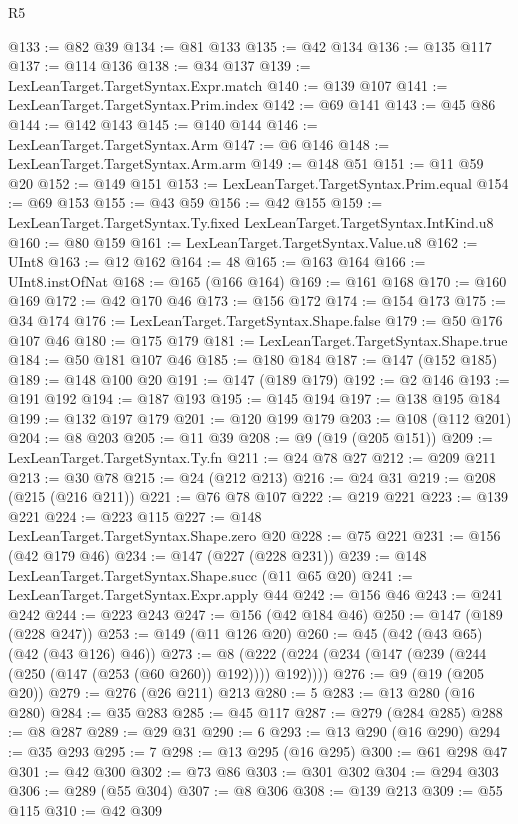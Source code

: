 \begin{lexlean}{R5}
\begin{coremodule}
@133 := @82 @39
@134 := @81 @133
@135 := @42 @134
@136 := @135 @117
@137 := @114 @136
@138 := @34 @137
@139 := LexLeanTarget.TargetSyntax.Expr.match
@140 := @139 @107
@141 := LexLeanTarget.TargetSyntax.Prim.index
@142 := @69 @141
@143 := @45 @86
@144 := @142 @143
@145 := @140 @144
@146 := LexLeanTarget.TargetSyntax.Arm
@147 := @6 @146
@148 := LexLeanTarget.TargetSyntax.Arm.arm
@149 := @148 @51
@151 := @11 @59 @20
@152 := @149 @151
@153 := LexLeanTarget.TargetSyntax.Prim.equal
@154 := @69 @153
@155 := @43 @59
@156 := @42 @155
@159 := LexLeanTarget.TargetSyntax.Ty.fixed LexLeanTarget.TargetSyntax.IntKind.u8
@160 := @80 @159
@161 := LexLeanTarget.TargetSyntax.Value.u8
@162 := UInt8
@163 := @12 @162
@164 := 48
@165 := @163 @164
@166 := UInt8.instOfNat
@168 := @165 (@166 @164)
@169 := @161 @168
@170 := @160 @169
@172 := @42 @170 @46
@173 := @156 @172
@174 := @154 @173
@175 := @34 @174
@176 := LexLeanTarget.TargetSyntax.Shape.false
@179 := @50 @176 @107 @46
@180 := @175 @179
@181 := LexLeanTarget.TargetSyntax.Shape.true
@184 := @50 @181 @107 @46
@185 := @180 @184
@187 := @147 (@152 @185)
@189 := @148 @100 @20
@191 := @147 (@189 @179)
@192 := @2 @146
@193 := @191 @192
@194 := @187 @193
@195 := @145 @194
@197 := @138 @195 @184
@199 := @132 @197 @179
@201 := @120 @199 @179
@203 := @108 (@112 @201)
@204 := @8 @203
@205 := @11 @39
@208 := @9 (@19 (@205 @151))
@209 := LexLeanTarget.TargetSyntax.Ty.fn
@211 := @24 @78 @27
@212 := @209 @211
@213 := @30 @78
@215 := @24 (@212 @213)
@216 := @24 @31
@219 := @208 (@215 (@216 @211))
@221 := @76 @78 @107
@222 := @219 @221
@223 := @139 @221
@224 := @223 @115
@227 := @148 LexLeanTarget.TargetSyntax.Shape.zero @20
@228 := @75 @221
@231 := @156 (@42 @179 @46)
@234 := @147 (@227 (@228 @231))
@239 := @148 LexLeanTarget.TargetSyntax.Shape.succ (@11 @65 @20)
@241 := LexLeanTarget.TargetSyntax.Expr.apply @44
@242 := @156 @46
@243 := @241 @242
@244 := @223 @243
@247 := @156 (@42 @184 @46)
@250 := @147 (@189 (@228 @247))
@253 := @149 (@11 @126 @20)
@260 := @45 (@42 (@43 @65) (@42 (@43 @126) @46))
@273 := @8 (@222 (@224 (@234 (@147 (@239 (@244 (@250 (@147 (@253 (@60 @260)) @192)))) @192))))
@276 := @9 (@19 (@205 @20))
@279 := @276 (@26 @211) @213
@280 := 5
@283 := @13 @280 (@16 @280)
@284 := @35 @283
@285 := @45 @117
@287 := @279 (@284 @285)
@288 := @8 @287
@289 := @29 @31
@290 := 6
@293 := @13 @290 (@16 @290)
@294 := @35 @293
@295 := 7
@298 := @13 @295 (@16 @295)
@300 := @61 @298 @47
@301 := @42 @300
@302 := @73 @86
@303 := @301 @302
@304 := @294 @303
@306 := @289 (@55 @304)
@307 := @8 @306
@308 := @139 @213
@309 := @55 @115
@310 := @42 @309

\end{coremodule}
\end{lexlean}
